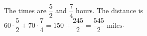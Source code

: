 The times are $\dfrac{5}{2}$ and $\dfrac{7}{4}$ hours. The distance is $60\cdot\dfrac{5}{2}+70\cdot\dfrac{7}{4}=150+\dfrac{245}{2}=\boxed{\dfrac{545}{2}\text{ miles}}$.
